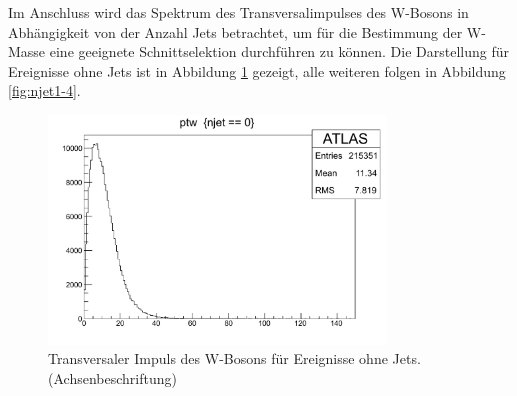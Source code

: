 \documentclass[11pt, a4paper]{article}
\numberwithin{equation}{section}
\newcommand{\korr}[1]{{\color{red}(#1)}}
\begin{document}
Im Anschluss wird das Spektrum des Transversalimpulses des W-Bosons in Abhängigkeit von der Anzahl Jets betrachtet, um für die Bestimmung der W-Masse eine geeignete Schnittselektion durchführen zu können.
Die Darstellung für Ereignisse ohne Jets ist in Abbildung \ref{fig:njet0} gezeigt, alle weiteren folgen in Abbildung \ref{fig:njet1-4}.
\begin{figure}[h]
	\centering
	\includegraphics[width=0.8\textwidth]{./data/root/wmass/exercise2/njet0}
	\caption{Transversaler Impuls des W-Bosons für Ereignisse ohne Jets.\korr{Achsenbeschriftung}}
	\label{fig:njet0}
\end{figure}
\end{document}
